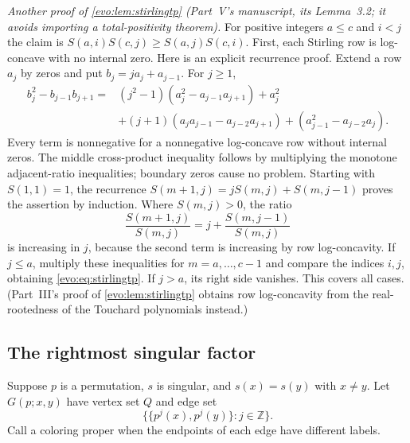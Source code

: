 \documentclass[11pt,a4paper]{article}
\numberwithin{equation}{section}
\theoremstyle{definition}
\theoremstyle{remark}
\newcommand{\Z}{\mathbb Z}
\begin{document}
\noindent\emph{Another proof of \cref{evo:lem:stirlingtp} (Part~V's
manuscript, its Lemma~3.2; it avoids importing a total-positivity
theorem).} For positive integers $a\le c$ and $i<j$ the claim is
$S(a,i)S(c,j)\ge S(a,j)S(c,i)$. First, each Stirling row is log-concave
with no internal zero. Here is an explicit recurrence proof. Extend a row
$a_j$ by zeros and put $b_j=ja_j+a_{j-1}$. For $j\ge1$,
\begin{align*}
 b_j^2-b_{j-1}b_{j+1}
 ={}&(j^2-1)(a_j^2-a_{j-1}a_{j+1})+a_j^2\\
 &+(j+1)(a_ja_{j-1}-a_{j-2}a_{j+1})
   +(a_{j-1}^2-a_{j-2}a_j).
\end{align*}
Every term is nonnegative for a nonnegative log-concave row without
internal zeros. The middle cross-product inequality follows by multiplying
the monotone adjacent-ratio inequalities; boundary zeros cause no problem.
Starting with $S(1,1)=1$, the recurrence
$S(m+1,j)=jS(m,j)+S(m,j-1)$ proves the assertion by induction.
Where $S(m,j)>0$, the ratio
\[
 \frac{S(m+1,j)}{S(m,j)}
 =j+\frac{S(m,j-1)}{S(m,j)}
\]
is increasing in $j$, because the second term is increasing by row
log-concavity. If $j\le a$, multiply these inequalities for
$m=a,\ldots,c-1$ and compare the indices $i,j$, obtaining
\eqref{evo:eq:stirlingtp}. If $j>a$, its right side vanishes. This covers
all cases. (Part~III's proof of \cref{evo:lem:stirlingtp} obtains row
log-concavity from the real-rootedness of the Touchard polynomials
instead.)

\subsection{The rightmost singular factor}
Suppose $p$ is a permutation, $s$ is singular, and $s(x)=s(y)$ with $x\ne y$.
Let $G(p;x,y)$ have vertex set $Q$ and edge set
\begin{equation}\label{nl:eq:edges}
 \bigl\{\{p^j(x),p^j(y)\}:j\in\Z\bigr\}.
\end{equation}
Call a coloring proper when the endpoints of each edge have different labels.
\end{document}
